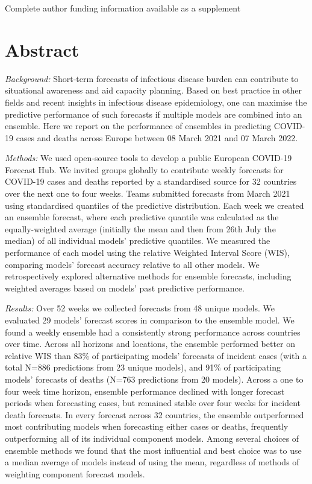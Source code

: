 \documentclass[
]{article}
\begin{document}
Complete author funding information available as a supplement

\hypertarget{abstract}{%
\section{Abstract}\label{abstract}}

\emph{Background:} Short-term forecasts of infectious disease burden can contribute to situational awareness and aid capacity planning. Based on best practice in other fields and recent insights in infectious disease epidemiology, one can maximise the predictive performance of such forecasts if multiple models are combined into an ensemble. Here we report on the performance of ensembles in predicting COVID-19 cases and deaths across Europe between 08 March 2021 and 07 March 2022.

\emph{Methods:} We used open-source tools to develop a public European COVID-19 Forecast Hub. We invited groups globally to contribute weekly forecasts for COVID-19 cases and deaths reported by a standardised source for 32 countries over the next one to four weeks. Teams submitted forecasts from March 2021 using standardised quantiles of the predictive distribution. Each week we created an ensemble forecast, where each predictive quantile was calculated as the equally-weighted average (initially the mean and then from 26th July the median) of all individual models' predictive quantiles. We measured the performance of each model using the relative Weighted Interval Score (WIS), comparing models' forecast accuracy relative to all other models. We retrospectively explored alternative methods for ensemble forecasts, including weighted averages based on models' past predictive performance.

\emph{Results:} Over 52 weeks we collected forecasts from 48 unique models. We evaluated 29 models' forecast scores in comparison to the ensemble model. We found a weekly ensemble had a consistently strong performance across countries over time. Across all horizons and locations, the ensemble performed better on relative WIS than 83\% of participating models' forecasts of incident cases (with a total N=886 predictions from 23 unique models), and 91\% of participating models' forecasts of deaths (N=763 predictions from 20 models). Across a one to four week time horizon, ensemble performance declined with longer forecast periods when forecasting cases, but remained stable over four weeks for incident death forecasts. In every forecast across 32 countries, the ensemble outperformed most contributing models when forecasting either cases or deaths, frequently outperforming all of its individual component models. Among several choices of ensemble methods we found that the most influential and best choice was to use a median average of models instead of using the mean, regardless of methods of weighting component forecast models.
\end{document}
